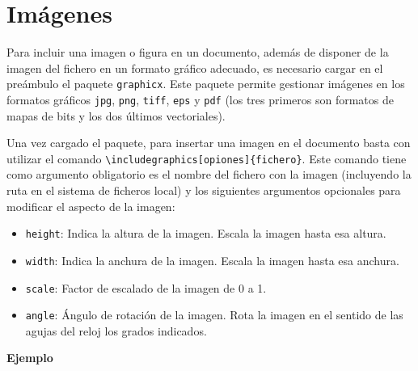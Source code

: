 \documentclass[
  a4paper,
]{scrreport}
\providecommand{\tightlist}{%
  \setlength{\itemsep}{0pt}\setlength{\parskip}{0pt}}\usepackage{longtable,booktabs,array}
\begin{document}

\hypertarget{imuxe1genes}{%
\chapter{Imágenes}\label{imuxe1genes}}

Para incluir una imagen o figura en un documento, además de disponer de
la imagen del fichero en un formato gráfico adecuado, es necesario
cargar en el preámbulo el paquete \texttt{graphicx}. Este paquete
permite gestionar imágenes en los formatos gráficos \texttt{jpg},
\texttt{png}, \texttt{tiff}, \texttt{eps} y \texttt{pdf} (los tres
primeros son formatos de mapas de bits y los dos últimos vectoriales).

Una vez cargado el paquete, para insertar una imagen en el documento
basta con utilizar el comando
\texttt{\textbackslash{}includegraphics{[}opiones{]}\{fichero\}}. Este
comando tiene como argumento obligatorio es el nombre del fichero con la
imagen (incluyendo la ruta en el sistema de ficheros local) y los
siguientes argumentos opcionales para modificar el aspecto de la imagen:

\begin{itemize}
\tightlist
\item
  \texttt{height}: Indica la altura de la imagen. Escala la imagen hasta
  esa altura.
\item
  \texttt{width}: Indica la anchura de la imagen. Escala la imagen hasta
  esa anchura.
\item
  \texttt{scale}: Factor de escalado de la imagen de 0 a 1.
\item
  \texttt{angle}: Ángulo de rotación de la imagen. Rota la imagen en el
  sentido de las agujas del reloj los grados indicados.
\end{itemize}

\textbf{Ejemplo}
\end{document}
